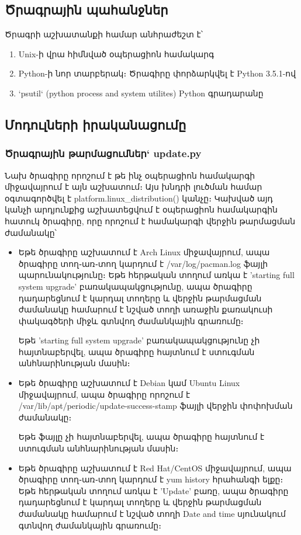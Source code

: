 \documentclass[12pt]{article}
\begin{document}
\begin{sloppypar}
\subsection{Ծրագրային պահանջներ}

Ծրագրի աշխատանքի համար անհրաժեշտ է՝

\begin{enumerate}
\item Unix-ի վրա հիմնված օպերացիոն համակարգ
\item Python-ի նոր տարբերակ։ Ծրագիրը փորձարկվել է Python 3.5.1-ով
\item `psutil` (python process and system utilites) Python գրադարանը
\end{enumerate}

\subsection{Մոդուլների իրականացումը}


\subsubsection{Ծրագրային թարմացումներ` update.py}


Նախ ծրագիրը որոշում է թե ինչ օպերացիոն համակարգի միջավայրում է այն աշխատում։
Այս խնդրի լուծման համար օգտագործվել է platform.linux\_distribution() կանչը։
Կախված այդ կանչի արդյունքից աշխատեցվում է օպերացիոն համակարգին հատուկ
ծրագիրը, որը որոշում է համակարգի վերջին թարմացման ժամանակը՝

\begin{itemize}
\item Եթե ծրագիրը աշխատում է Arch Linux միջավայրում, ապա ծրագիրը տող֊առ֊տող
    կարդում է /var/log/pacman.log ֆայլի պարունակությունը։ Եթե հերթական տողում առկա է
	'starting full system upgrade' բառակապակցությունը, ապա ծրագիրը դադարեցնում
	է կարդալ տողերը և վերջին թարմացման ժամանակը համարում է նշված տողի առաջին
	քառակուսի փակագծերի միջև գտնվող ժամանկային գրառումը։

	Եթե 'starting full system upgrade' բառակապակցությունը չի հայտնաբերվել,
	ապա ծրագիրը հայտնում է ստուգման անհնարինության մասին։
\item Եթե ծրագիրը աշխատում է Debian կամ Ubuntu Linux միջավայրում, ապա ծրագիրը
	որոշում է /var/lib/apt/periodic/update-success-stamp ֆայլի վերջին փոփոխման
	ժամանակը։

	Եթե ֆայլը չի հայտնաբերվել, ապա ծրագիրը հայտնում է ստուգման անհնարինության
	մասին։
\item Եթե ծրագիրը աշխատում է Red Hat/CentOS միջավայրում, ապա ծրագիրը տող֊առ֊տող
    կարդում է yum history հրահանգի ելքը։ Եթե հերթական տողում առկա է
	'Update' բառը, ապա ծրագիրը դադարեցնում
	է կարդալ տողերը և վերջին թարմացման ժամանակը համարում է նշված տողի 
	Date and time սյունակում գտնվող ժամանկային գրառումը։


\end{itemize}
\end{sloppypar}
\end{document}
